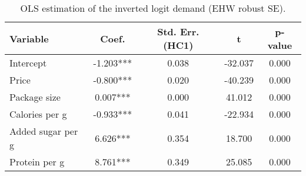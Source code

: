 \begin{table}[H]
\centering
\begin{tabular}{lcccc}
\toprule
Variable & Coef. & Std. Err. (HC1) & t & p-value \\
\midrule
Intercept & -1.203*** & 0.038 & -32.037 & 0.000 \\
Price & -0.800*** & 0.020 & -40.239 & 0.000 \\
Package size & 0.007*** & 0.000 & 41.012 & 0.000 \\
Calories per g & -0.933*** & 0.041 & -22.934 & 0.000 \\
Added sugar per g & 6.626*** & 0.354 & 18.700 & 0.000 \\
Protein per g & 8.761*** & 0.349 & 25.085 & 0.000 \\
\bottomrule
\end{tabular}
\caption{OLS estimation of the inverted logit demand (EHW robust SE).}
\label{tab:q3_ols_ehw}
\end{table}
